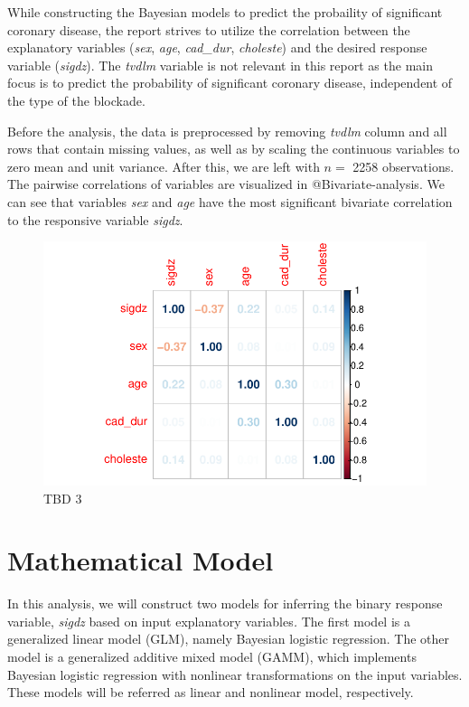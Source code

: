 \documentclass[
  letterpaper,
  DIV=11,
  numbers=noendperiod]{scrartcl}
\begin{document}
While constructing the Bayesian models to predict the probaility of
significant coronary disease, the report strives to utilize the
correlation between the explanatory variables (\emph{sex}, \emph{age},
\emph{cad\_dur}, \emph{choleste}) and the desired response variable
(\emph{sigdz}). The \emph{tvdlm} variable is not relevant in this report
as the main focus is to predict the probability of significant coronary
disease, independent of the type of the blockade.

Before the analysis, the data is preprocessed by removing \emph{tvdlm}
column and all rows that contain missing values, as well as by scaling
the continuous variables to zero mean and unit variance. After this, we
are left with \(n =\) 2258 observations. The pairwise correlations of
variables are visualized in @Bivariate-analysis. We can see that
variables \emph{sex} and \emph{age} have the most significant bivariate
correlation to the responsive variable \emph{sigdz}.

\begin{figure}

{\centering \includegraphics{project_final_files/figure-pdf/Bivariate-analysis-1.pdf}

}

\caption{TBD 3}

\end{figure}

\hypertarget{mathematical-model}{%
\section{Mathematical Model}\label{mathematical-model}}

In this analysis, we will construct two models for inferring the binary
response variable, \emph{sigdz} based on input explanatory
variables\emph{.} The first model is a generalized linear model (GLM),
namely Bayesian logistic regression. The other model is a generalized
additive mixed model (GAMM), which implements Bayesian logistic
regression with nonlinear transformations on the input variables. These
models will be referred as linear and nonlinear model, respectively.
\end{document}
